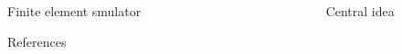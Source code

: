 \documentclass[final]{beamer}
\newlength{\sepwid}
\newlength{\onecolwid}
\newlength{\twocolwid}
\begin{document}
\begin{frame}[t]
\begin{columns}[t]
\begin{column}{\onecolwid}
\begin{alertblock}{Finite element smulator}
\begin{itemize}

\end{itemize}
\end{alertblock}

\begin{alertblock}{References}
{
\tiny




}

\end{alertblock}



%
%
%
%


\end{column} %



\begin{column}{\sepwid}\end{column} %

\begin{column}{\twocolwid} %


\begin{alertblock}{Central idea}


\end{alertblock}
\end{column}
\end{columns}
\end{frame}
\end{document}
